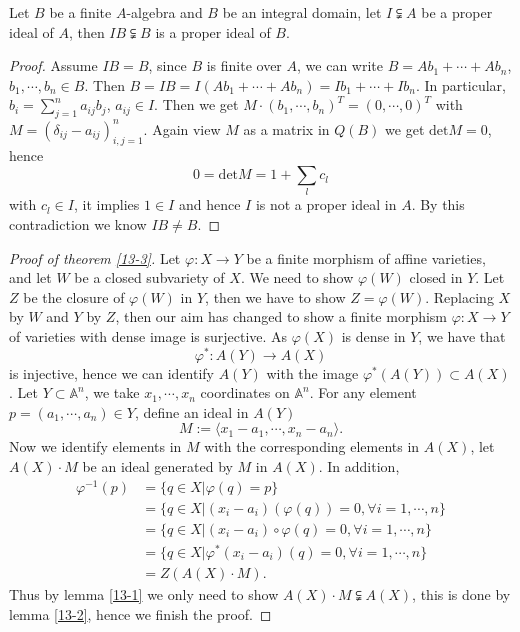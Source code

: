 \begin{lemma}\label{13-2}
	Let $ B $ be a finite $ A $-algebra and $ B $ be an integral domain, let $ I\subsetneqq A $ be a proper ideal of $ A $, then $ IB\subsetneqq B $ is a proper ideal of $ B $.
\end{lemma}
\begin{proof}
	Assume $ IB = B$, since $ B $ is finite over $ A $, we can write $ B=Ab_1+\cdots+Ab_n $, $ b_1,\cdots,b_n\in B $. Then $ B=IB=I(Ab_1+\cdots+Ab_n)=Ib_1+\cdots+Ib_n $. In particular, $ b_i=\sum\limits_{j=1}^{n}a_{ij}b_j $, $ a_{ij}\in I $. Then we get $ M\cdot (b_1,\cdots,b_n)^{T}=(0,\cdots,0)^{T} $ with $ M=(\delta_{ij}-a_{ij})_{i,j=1}^{n} $. Again view $ M $ as a matrix in $ Q(B) $ we get $ \text{det}M=0 $, hence
	$$
		0=\text{det}M=1+\sum\limits_{l}c_l
	$$
	with $ c_l\in I $, it implies $ 1\in I $ and hence $ I $ is not a proper ideal in $ A $. By this contradiction we know $ IB\neq B $.
\end{proof}
\begin{proof}[Proof of theorem \ref{13-3}]
	Let $ \varphi :X\to Y $ be a finite morphism of affine varieties, and let $ W $ be a closed subvariety of $ X $. We need  to show $ \varphi(W) $ closed in $ Y $. Let $ Z $ be the closure of $ \varphi(W) $ in $ Y $, then we have to show $ Z=\varphi(W) $. Replacing $ X $ by $ W $ and $ Y $ by $ Z $, then our aim has changed to show a finite morphism $ \varphi:X\to Y $ of varieties with dense image is surjective.
	As $ \varphi (X) $ is dense in $ Y $, we have that
	$$
		\varphi^{\ast}:A(Y)\to A(X)
	$$
	is injective, hence we can identify $ A(Y) $ with the image $ \varphi^{\ast}(A(Y))\subset A(X)$. Let $ Y\subset \mathbb{A}^n $, we take $ x_1,\cdots,x_n $ coordinates on $ \mathbb{A}^n $. For any element $ p=(a_1,\cdots,a_n)\in Y $, define an ideal in $ A(Y) $
	$$ M:=\langle x_1-a_1,\cdots,x_n-a_n \rangle. $$
	Now we identify elements in $ M $ with the corresponding elements in $ A(X) $,  let $ A(X)\cdot M $ be an ideal generated by $ M $ in $ A(X) $. In addition,
	\begin{align*}
		\varphi^{-1}(p) & =  \lbrace q\in X|\varphi(q)=p \rbrace                                      \\
		{ }             & =  \lbrace q\in X|(x_i-a_i)(\varphi(q))=0,\forall i=1,\cdots,n \rbrace      \\
		{ }             & =  \lbrace q\in X|(x_i-a_i)\circ \varphi (q)=0,\forall i=1,\cdots,n \rbrace \\
		{ }             & =  \lbrace q\in X|\varphi^\ast(x_i-a_i)(q)=0,\forall i=1,\cdots,n  \rbrace  \\
		{ }             & =  Z(A(X)\cdot M).
	\end{align*}
	Thus by lemma \ref{13-1} we only need to show $ A(X)\cdot M \subsetneqq A(X)$, this is done by lemma \ref{13-2}, hence we finish the proof.
\end{proof}

